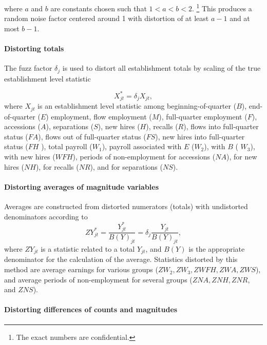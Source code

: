 \noindent where $a$ and $b$ are constants chosen such that $1 < a < b < 2$.%
%
\footnote{%
The exact numbers are confidential.}
%
This produces a random noise factor
centered around 1 with distortion of at least $a-1$ and at most $b-1$.



\paragraph{Distorting totals}


The fuzz factor $\delta _{j}$ is used to distort all establishment
 totals by scaling of the true establishment level statistic

\[
\label{eq:fuzz_totals}X_{jt}^{\ast }=\delta _{j}X_{jt},
\]%
where $X_{jt}$ is an establishment level statistic among 
beginning-of-quarter ($B$), end-of-quarter ($E$) employment, flow employment
($M$), full-quarter employment ($F$), accessions ($A$), separations ($S$),
new hires ($H$), recalls ($R$), flows into full-quarter status ($FA$), flows
out of full-quarter status ($FS$), new hires into full-quarter status ($FH$%
), total payroll ($W_{1}$), payroll associated with $E$ ($W_{2}$), with $B$ (%
$W_{3}$), with new hires ($WFH$), periods of non-employment for accessions ($%
NA$), for new hires ($NH$), for recalls ($NR$), and for separations ($NS$).

\paragraph{Distorting  averages of magnitude variables}


Averages are constructed from distorted numerators (totals) with undistorted
denominators according to 
\[
ZY_{jt}^{\ast }=%
\frac{Y_{jt}^{\ast }}{B(Y)_{jt}}=\delta _{j}\frac{Y_{jt}}{B(Y)_{jt}},
\]%
where $ZY_{jt}$ is a statistic related to a total $Y_{jt}$, and $B(Y)$ is
the appropriate denominator for the calculation of the average. Statistics
distorted by this method are average earnings for various groups ($%
ZW_{2},ZW_{3},ZWFH,ZWA,ZWS$), and average periods of non-employment for
several groups ($ZNA,ZNH,ZNR$, and $ZNS$).

\paragraph{Distorting  differences of counts and magnitudes}


